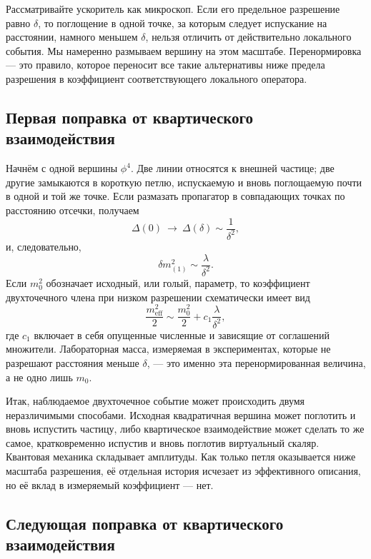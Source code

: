 Рассматривайте ускоритель как микроскоп. Если его предельное разрешение равно \(\delta\), то поглощение в одной точке, за которым следует испускание на расстоянии, намного меньшем \(\delta\), нельзя отличить от действительно локального события. Мы намеренно размываем вершину на этом масштабе. Перенормировка — это правило, которое переносит все такие альтернативы ниже предела разрешения в коэффициент соответствующего локального оператора.

\subsection{Первая поправка от квартического взаимодействия}

Начнём с одной вершины \(\phi^4\). Две линии относятся к внешней частице; две другие замыкаются в короткую петлю, испускаемую и вновь поглощаемую почти в одной и той же точке. Если размазать пропагатор в совпадающих точках по расстоянию отсечки, получаем
\begin{equation}
\Delta(0)\ \longrightarrow\ \Delta(\delta)\sim\frac{1}{\delta^2},
\end{equation}
и, следовательно,
\begin{equation}
\delta m^2_{(1)}\sim\frac{\lambda}{\delta^2}.
\label{eq:one-loop-scalar-mass}
\end{equation}
Если \(m_0^2\) обозначает исходный, или голый, параметр, то коэффициент двухточечного члена при низком разрешении схематически имеет вид
\begin{equation}
\frac{m_{\mathrm{eff}}^2}{2}
\sim
\frac{m_0^2}{2}
+c_1\frac{\lambda}{\delta^2},
\label{eq:first-renormalized-mass}
\end{equation}
где \(c_1\) включает в себя опущенные численные и зависящие от соглашений множители. Лабораторная масса, измеряемая в экспериментах, которые не разрешают расстояния меньше \(\delta\), — это именно эта перенормированная величина, а не одно лишь \(m_0\).

Итак, наблюдаемое двухточечное событие может происходить двумя неразличимыми способами. Исходная квадратичная вершина может поглотить и вновь испустить частицу, либо квартическое взаимодействие может сделать то же самое, кратковременно испустив и вновь поглотив виртуальный скаляр. Квантовая механика складывает амплитуды. Как только петля оказывается ниже масштаба разрешения, её отдельная история исчезает из эффективного описания, но её вклад в измеряемый коэффициент — нет.

\subsection{Следующая поправка от квартического взаимодействия}

